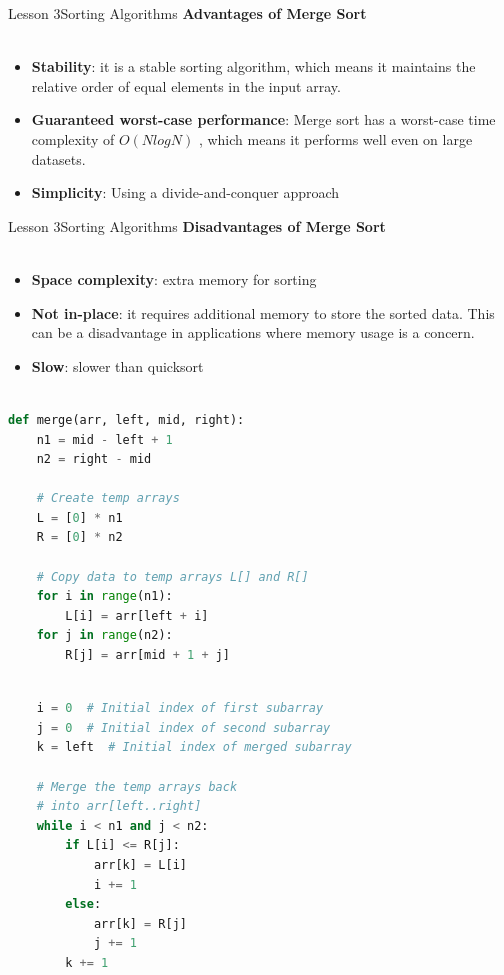 \documentclass[aspectratio=1610]{beamer}
\begin{document}
\begin{frame}{Lesson 3}{Sorting Algorithms}
\LARGE
\textbf{Advantages of Merge Sort}\\~\\
\Large
\begin{itemize}
	\item \textbf{Stability}: it is a stable sorting algorithm, which means it maintains the relative order of equal elements in the input array.	
	\item \textbf{Guaranteed worst-case performance}: Merge sort has a worst-case time complexity of $O(N logN)$ , which means it performs well even on large datasets.
	\item \textbf{Simplicity}: Using a divide-and-conquer approach
\end{itemize}
\end{frame}


\begin{frame}{Lesson 3}{Sorting Algorithms}
\LARGE
\textbf{Disadvantages of Merge Sort}\\~\\
\Large
\begin{itemize}
	\item \textbf{Space complexity}: extra memory for sorting
	\item \textbf{Not in-place}: it requires additional memory to store the sorted data. This can be a disadvantage in applications where memory usage is a concern.
	\item \textbf{Slow}: slower than quicksort
\end{itemize}
\end{frame}


\begin{frame}[fragile]
\begin{lstlisting}[language=Python]

def merge(arr, left, mid, right):
    n1 = mid - left + 1
    n2 = right - mid

    # Create temp arrays
    L = [0] * n1
    R = [0] * n2

    # Copy data to temp arrays L[] and R[]
    for i in range(n1):
        L[i] = arr[left + i]
    for j in range(n2):
        R[j] = arr[mid + 1 + j]

\end{lstlisting}
\end{frame}


\begin{frame}[fragile]
\begin{lstlisting}[language=Python]

    i = 0  # Initial index of first subarray
    j = 0  # Initial index of second subarray
    k = left  # Initial index of merged subarray

    # Merge the temp arrays back
    # into arr[left..right]
    while i < n1 and j < n2:
        if L[i] <= R[j]:
            arr[k] = L[i]
            i += 1
        else:
            arr[k] = R[j]
            j += 1
        k += 1

\end{lstlisting}
\end{frame}
\end{document}
